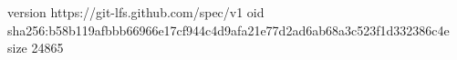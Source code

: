 version https://git-lfs.github.com/spec/v1
oid sha256:b58b119afbbb66966e17cf944c4d9afa21e77d2ad6ab68a3c523f1d332386c4e
size 24865
